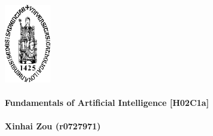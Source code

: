 \begin{titlepage}
    \includegraphics[height=3.4cm]{../others/sedes.pdf}
    \\ \\
    \textbf{Fundamentals of Artificial Intelligence [H02C1a]}
    \\ \\ 
    \textbf{Xinhai Zou (r0727971)}
\end{titlepage}